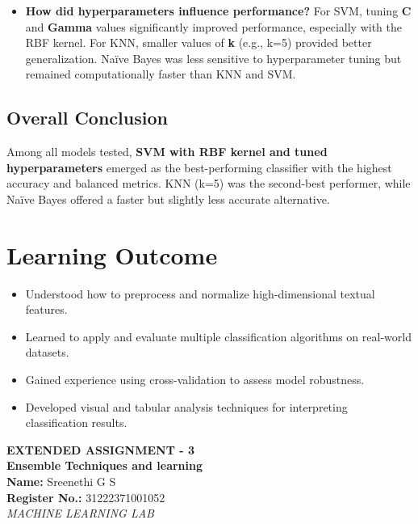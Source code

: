 \documentclass[12pt]{article}
\begin{document}
\begin{itemize}
\begin{itemize}
  \item \textbf{How did hyperparameters influence performance?}  
  For SVM, tuning \textbf{C} and \textbf{Gamma} values significantly improved performance, especially with the RBF kernel. For KNN, smaller values of \textbf{k} (e.g., k=5) provided better generalization. Naïve Bayes was less sensitive to hyperparameter tuning but remained computationally faster than KNN and SVM.
\end{itemize}

\subsection*{Overall Conclusion}
Among all models tested, \textbf{SVM with RBF kernel and tuned hyperparameters} emerged as the best-performing classifier with the highest accuracy and balanced metrics. KNN (k=5) was the second-best performer, while Naïve Bayes offered a faster but slightly less accurate alternative.

\end{itemize}


\section*{Learning Outcome}
\begin{itemize}
  \item Understood how to preprocess and normalize high-dimensional textual features.
  \item Learned to apply and evaluate multiple classification algorithms on real-world datasets.
  \item Gained experience using cross-validation to assess model robustness.
  \item Developed visual and tabular analysis techniques for interpreting classification results.
\end{itemize}

\newpage
\begin{titlepage}
    \centering
    \vspace*{3cm}
    
    {\LARGE \textbf{EXTENDED ASSIGNMENT - 3}}\\[1.5cm]
    
    {\Large \textbf{Ensemble Techniques and learning}}\\[2cm]
    
    {\large \textbf{Name:} Sreenethi G S}\\[0.4cm]
    {\large \textbf{Register No.:} 31222371001052}\\[0.4cm]
    
    {\large \textit{MACHINE LEARNING LAB}}\\[6cm]
    
    \vfill
\end{titlepage}
\end{document}
